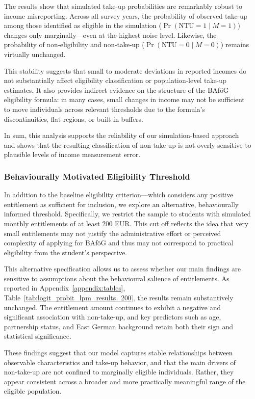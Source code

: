 

The results show that simulated take-up probabilities are remarkably robust to income misreporting. 
Across all survey years, the probability of observed take-up among those identified as eligible in the simulation (\( \Pr(\mathrm{NTU}=1 \mid M=1) \)) changes only marginally—even at the highest noise level. 
Likewise, the probability of non-eligibility and non-take-up (\( \Pr(\mathrm{NTU}=0 \mid M=0) \)) remains virtually unchanged.

This stability suggests that small to moderate deviations in reported incomes do not substantially affect eligibility classification or population-level take-up estimates. 
It also provides indirect evidence on the structure of the BAföG eligibility formula: in many cases, small changes in income may not be sufficient to move individuals across relevant thresholds due to the formula’s discontinuities, flat regions, or built-in buffers.

In sum, this analysis supports the reliability of our simulation-based approach and shows that the resulting classification of non-take-up is not overly sensitive to plausible levels of income measurement error.

\subsubsection{Behaviourally Motivated Eligibility Threshold}
In addition to the baseline eligibility criterion—which considers any positive entitlement as sufficient for inclusion, we explore an alternative, behaviourally informed threshold. 
Specifically, we restrict the sample to students with simulated monthly entitlements of at least 200 EUR. 
This cut off reflects the idea that very small entitlements may not justify the administrative effort or perceived complexity of applying for BAföG and thus may not correspond to practical eligibility from the student’s perspective.

This alternative specification allows us to assess whether our main findings are sensitive to assumptions about the behavioural salience of entitlements. 
As reported in Appendix~\ref{appendix:tables}, Table~\ref{tab:logit_probit_lpm_results_200}, the results remain substantively unchanged. 
The entitlement amount continues to exhibit a negative and significant association with non-take-up, and key predictors such as age, partnership status, and East German background retain both their sign and statistical significance.

These findings suggest that our model captures stable relationships between observable characteristics and take-up behavior, and that the main drivers of non-take-up are not confined to marginally eligible individuals. 
Rather, they appear consistent across a broader and more practically meaningful range of the eligible population.
